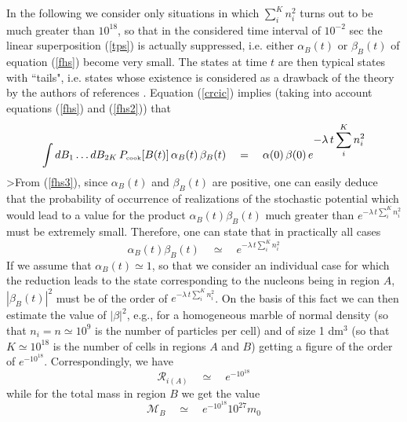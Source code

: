 \documentclass[12pt]{article}
\begin{document}
In the following we consider only situations in which
$\sum_{i}^{K}n^{2}_{i}$ turns out to be much greater than
$10^{18}$, so that in the considered time interval of $10^{-2}$
sec the linear superposition (\ref{tps}) is actually suppressed,
i.e. either $\alpha_{B}(t)$ or $\beta_{B}(t)$ of equation
(\ref{fhs}) become very small. The states at time $t$ are then
typical states with ``tails", i.e. states whose existence is
considered as a drawback of the theory by the authors of
references \cite{shi90,alo1,lew,cli1,cli2}. Equation (\ref{crcic})
implies (taking into account equations (\ref{fhs}) and
(\ref{fhs2})) that
\begin{equation} \label{fhs3}
\int dB_{1} \ldots dB_{2K}\, P_{\makebox{\tiny cook}}[B(t)]\,
\alpha_{B}(t)\, \beta_{B}(t) \quad = \quad \alpha(0)\,\beta(0) \,
e^{\displaystyle -\lambda\, t \sum_{i}^{K} n^{2}_{i}}
\end{equation}
>From (\ref{fhs3}), since $\alpha_{B}(t)$ and $\beta_{B}(t)$ are
positive, one can easily deduce that the probability of occurrence
of realizations of the stochastic potential which would lead to a
value for the product $\alpha_{B}(t) \beta_{B}(t)$  much greater
than $e^{-\lambda\, t \sum_{i}^{K} n^{2}_{i}}$ must be extremely
small. Therefore, one can state that in practically all cases
\begin{equation}
\alpha_{B}(t) \beta_{B}(t) \quad \simeq \quad e^{\displaystyle
-\lambda\, t \sum_{i}^{K} n^{2}_{i}}
\end{equation}
If we assume that $\alpha_{B}(t) \simeq 1$, so that we consider an
individual case for which the reduction leads to the state
corresponding to the nucleons being in region $A$,
$|\beta_{B}(t)|^{2}$  must be of the order of $e^{-\lambda\, t
\sum_{i}^{K} n^{2}_{i}}$.  On the basis of this fact we can then
estimate the value of $|\beta|^{2}$, e.g., for a homogeneous
marble of normal density (so that $n_{i} = n \simeq 10^{9}$ is the
number of particles per cell) and of size 1 dm$^{3}$ (so that $K
\simeq 10^{18}$ is the number of cells in regions $A$ and $B$)
getting a figure of the order of $e^{-10^{18}}$. Correspondingly,
we have
\begin{equation} \label{efr}
{\mathcal R}_{i(A)} \quad \simeq \quad e^{\displaystyle -10^{18}}
\end{equation}
while for the total mass in region $B$ we get the value
\begin{equation} \label{efm}
{\mathcal M}_{B} \quad \simeq \quad e^{\displaystyle -10^{18}}
10^{27} m_{0}
\end{equation}
\end{document}
